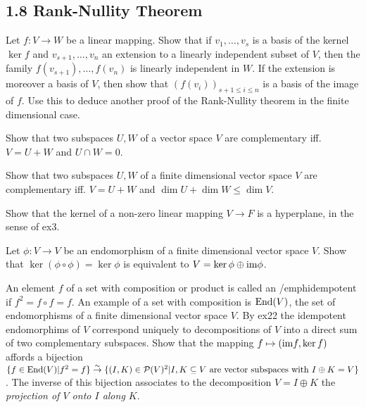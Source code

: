 \subsection*{1.8 Rank-Nullity Theorem}
\item Let $f : V \to W$ be a linear mapping. Show that if $v_{1}, \dots, v_{s}$ is a basis of the kernel $\ker f$ and $v_{s+1}, \dots, v_{n}$ an extension to a linearly independent subset of $V$, then the family $f(v_{s+1}), \dots, f(v_{n})$ is linearly independent in $W$. If the extension is moreover a basis of $V$, then show that $(f(v_{i}))_{s+1 \le i \le n}$ is a basis of the image of $f$. Use this to deduce another proof of the Rank-Nullity theorem in the finite dimensional case.
\item Show that two subspaces $U,W$ of a vector space $V$ are complementary iff. $V = U + W$ and $U \cap W = 0$.
\item Show that two subspaces $U,W$ of a finite dimensional vector space $V$ are complementary iff. $V = U + W$ and $\dim U + \dim W \le \dim V$.
\item Show that the kernel of a non-zero linear mapping $V \to F$ is a hyperplane, in the sense of ex3.
\item Let $\phi : V \to V$ be an endomorphism of a finite dimensional vector space $V$. Show that $\ker(\phi \circ \phi) = \ker \phi$ is equivalent to $V = \ker \phi \oplus \text{im} \phi$.
\item An element $f$ of a set with composition or product is called an /emph{idempotent} if $f^{2} = f \circ f = f$. An example of a set with composition is $\text{End}(V)$, the set of endomorphisms of a finite dimensional vector space $V$. By ex22 the idempotent endomorphims of $V$ correspond uniquely to decompositions of $V$ into a direct sum of two complementary subspaces. Show that the mapping $f \mapsto (\text{im} f, \ker f)$ affords a bijection $\{f \in \text{End}(V) | f^{2} = f\} \stackrel{\sim}{\to} \{(I, K) \in \mathcal{P}(V)^{2} | I, K \subseteq V \text{ are vector subspaces with } I \oplus K = V\}$. The inverse of this bijection associates to the decomposition $V = I \oplus K$ the \emph{projection of $V$ onto $I$ along $K$}.
